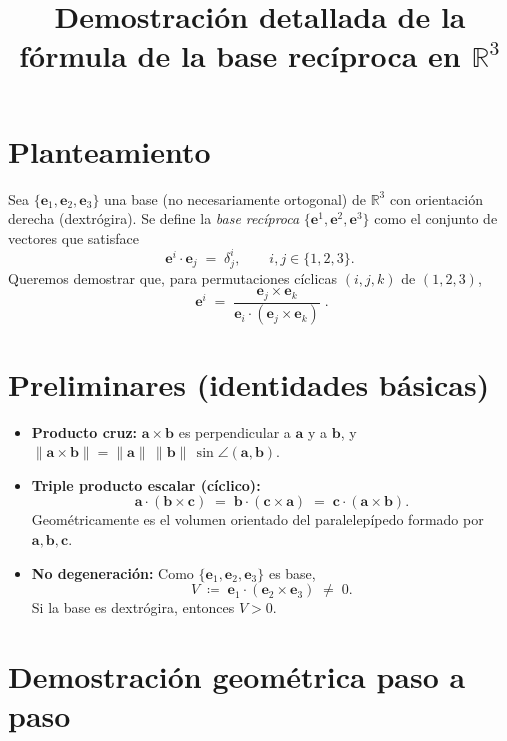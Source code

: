 \documentclass[12pt]{article}
\title{Demostración detallada de la fórmula de la base recíproca en $\mathbb{R}^3$}
\author{}
\date{}
\begin{document}
\maketitle

\section*{Planteamiento}
Sea $\{\mathbf e_1,\mathbf e_2,\mathbf e_3\}$ una base (no necesariamente ortogonal) de $\mathbb R^3$ con orientación derecha (dextrógira). 
Se define la \emph{base recíproca} $\{\mathbf e^1,\mathbf e^2,\mathbf e^3\}$ como el conjunto de vectores que satisface
\[
\mathbf e^i \cdot \mathbf e_j \;=\; \delta^i_j,
\qquad i,j\in\{1,2,3\}.
\]
Queremos demostrar que, para permutaciones cíclicas $(i,j,k)$ de $(1,2,3)$,
\begin{equation}\label{eq:formula}
\boxed{\;\mathbf e^i \;=\; \frac{\mathbf e_j \times \mathbf e_k}{\mathbf e_i \cdot (\mathbf e_j \times \mathbf e_k)}\;}.
\end{equation}

\section*{Preliminares (identidades básicas)}
\begin{itemize}
  \item \textbf{Producto cruz:} $\mathbf a\times \mathbf b$ es perpendicular a $\mathbf a$ y a $\mathbf b$, y 
  $\|\mathbf a\times \mathbf b\|=\|\mathbf a\|\,\|\mathbf b\|\,\sin\angle(\mathbf a,\mathbf b)$.
  \item \textbf{Triple producto escalar (cíclico):}
  \[
  \mathbf a\cdot(\mathbf b\times \mathbf c)\;=\;\mathbf b\cdot(\mathbf c\times \mathbf a)\;=\;\mathbf c\cdot(\mathbf a\times \mathbf b).
  \]
  Geométricamente es el volumen orientado del paralelepípedo formado por $\mathbf a,\mathbf b,\mathbf c$.
  \item \textbf{No degeneración:} Como $\{\mathbf e_1,\mathbf e_2,\mathbf e_3\}$ es base, 
  \[
  V \;\coloneqq\; \mathbf e_1\cdot(\mathbf e_2\times \mathbf e_3)\;\neq\;0.
  \]
  Si la base es dextrógira, entonces $V>0$.
\end{itemize}

\section*{Demostración geométrica paso a paso}
\end{document}
